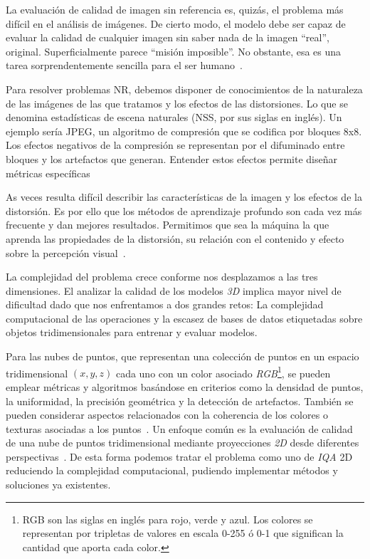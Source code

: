 La evaluación de calidad de imagen sin referencia es, quizás, el problema 
más difícil en el análisis de imágenes. De cierto modo, el modelo debe ser 
capaz de evaluar la calidad de cualquier imagen sin saber nada de la imagen ``real'', original. 
Superficialmente parece ``misión imposible''. No obstante, esa 
es una tarea sorprendentemente sencilla para el ser humano~\cite{Wang2006ModernIQ}. 

Para resolver problemas NR, debemos disponer de conocimientos de la naturaleza de las imágenes 
de las que tratamos y los efectos de las distorsiones. Lo que se denomina 
estadísticas de escena naturales (NSS, por sus siglas en inglés). Un ejemplo 
sería JPEG, un algoritmo de compresión que se codifica por bloques 8x8. Los efectos
negativos de la compresión se representan por el difuminado entre bloques y los artefactos que generan.
Entender estos efectos permite diseñar métricas específicas~\cite{SpatialDomainForJPEG}

As veces resulta difícil describir las características de la imagen y los efectos 
de la distorsión. Es por ello que los métodos de aprendizaje profundo son cada vez 
más frecuente y dan mejores resultados. Permitimos que sea la máquina la que aprenda 
las propiedades de la distorsión, su relación con el contenido y efecto sobre la 
percepción visual~\cite{Hallucinated-IQA, BIQA, DIPIQA}. 

La complejidad del problema crece conforme nos desplazamos a las tres dimensiones. 
El analizar la calidad de los modelos \emph{3D} implica mayor nivel de dificultad 
dado que nos enfrentamos a dos grandes retos: La complejidad computacional 
de las operaciones y la escasez de bases de datos etiquetadas
sobre objetos tridimensionales para entrenar y evaluar modelos. 

Para las nubes de puntos, que representan una colección de puntos en un espacio 
tridimensional $(x,y,z)$ cada uno con un color asociado \emph{RGB}\footnote{
  RGB son las siglas en inglés para rojo, verde y azul. Los colores se representan 
  por tripletas de valores en escala 0-255 ó 0-1 que significan la cantidad que aporta 
  cada color. 
}, se pueden emplear métricas y algoritmos basándose en criterios como la 
densidad de puntos, la uniformidad, la precisión geométrica y la detección de artefactos.
También se pueden considerar aspectos relacionados con la coherencia de los colores 
o texturas asociadas a los puntos~\cite{NR3DQA, SGR, GPA-NET}.
Un enfoque común es la evaluación de calidad de una nube de puntos tridimensional 
mediante proyecciones \emph{2D} desde diferentes perspectivas~\cite{IT-PCQA, VQA-PC, MM-PCQA}. 
De esta forma podemos tratar el problema como uno de \emph{IQA} 2D reduciendo la 
complejidad computacional, pudiendo implementar métodos y soluciones ya existentes.


